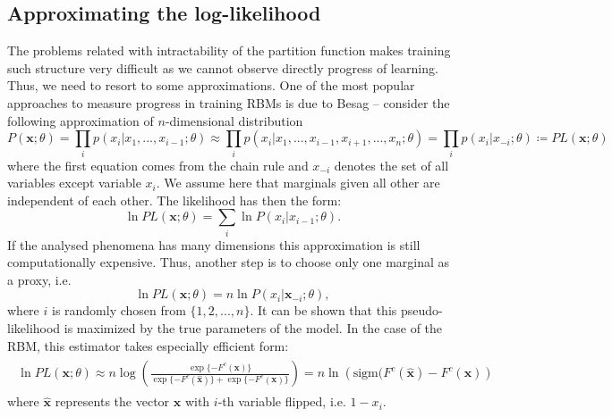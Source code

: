 \documentclass[../report/report.tex]{subfiles}
\begin{document}
\subsection{Approximating the log-likelihood}
The problems related with intractability of the partition function makes training such structure very difficult as we cannot observe directly progress of learning. Thus, we need to resort to some approximations. One of the most popular approaches to measure progress in training RBMs is due to Besag \cite{besag1972nearest} -- consider the following approximation of $n$-dimensional distribution
\begin{equation}
P(\mathbf{x}; \theta) = \prod_i p(x_i| x_1,...,x_{i-1};\theta) \approx \prod_i p(x_i | x_1, ..., x_{i-1}, x_{i+1},..., x_n;\theta) = \prod_i p(x_i| x_{-i} ;\theta) \coloneqq PL (\mathbf{x};\theta) 
\end{equation}
where the first equation comes from the chain rule and $x_{-i}$ denotes the set of all variables except variable $x_i$. We assume here that marginals given all other are independent of each other. The likelihood has then the form:
\begin{equation}
\ln PL(\mathbf{x}; \theta) = \sum_i \ln P(x_i | x_{i-1} ;\theta).
\end{equation}
If the analysed phenomena has many dimensions this approximation is still computationally expensive. Thus, another step is to choose only one marginal as a proxy, i.e.
\begin{equation}
\ln PL(\mathbf{x}; \theta) = n \ln P(x_i | \mathbf{x}_{-i} ; \theta),
\end{equation}
where $i$ is randomly chosen from $\{1,2, ..., n\}$. It can be shown that this pseudo-likelihood is maximized by the true parameters of the model. In the case of the RBM, this estimator takes especially efficient form:
\begin{align}
\begin{split}
\ln PL(\mathbf{x}; \theta) \approx n \log \left( \frac{\exp\{- F^c(\mathbf{x})\}}{\exp\{-F^c(\mathbf{\hat{x}})\} + \exp\{- F^c(\mathbf{x})\}} \right) = n \ln \left( \text{sigm}(F^c(\mathbf{\hat{x}}) - F^c(\mathbf{x}) \right)
\label{eq:pseudoLL}
\end{split}
\end{align}
where $\mathbf{\hat{x}}$ represents the vector $\mathbf{x}$ with $i$-th variable flipped, i.e. $1-x_i$.
\end{document}
